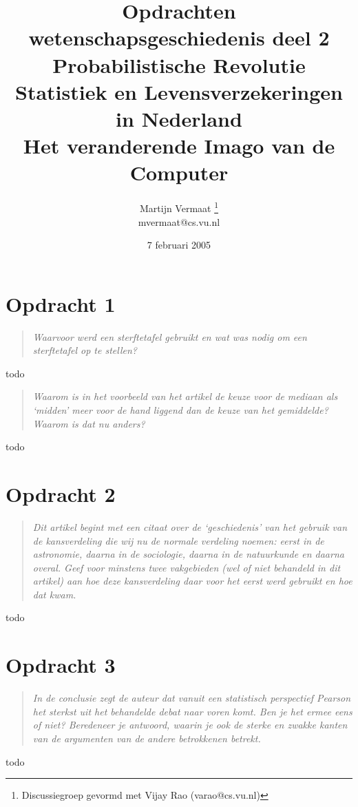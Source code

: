 \documentclass[a4paper,11pt]{article}
\title{Opdrachten wetenschapsgeschiedenis deel 2\\[0.6em]
\normalsize{Probabilistische Revolutie\\
Statistiek en Levensverzekeringen in Nederland\\
Het veranderende Imago van de Computer}}
\author{
    Martijn Vermaat
    \footnote{Discussiegroep gevormd met Vijay Rao (varao@cs.vu.nl)}\\
    mvermaat@cs.vu.nl
}
\date{7 februari 2005}
\begin{document}
\maketitle


\section*{Opdracht 1}


\begin{quote}
\emph{Waarvoor werd een sterftetafel gebruikt en wat was nodig om een
  sterftetafel op te stellen?}
\end{quote}


todo


\begin{quote}
\emph{Waarom is in het voorbeeld van het artikel de keuze voor de mediaan als
  `midden' meer voor de hand liggend dan de keuze van het gemiddelde? Waarom
  is dat nu anders?}
\end{quote}


todo


\section*{Opdracht 2}


\begin{quote}
\emph{Dit artikel begint met een citaat over de `geschiedenis' van het gebruik
van de kansverdeling die wij nu de normale verdeling noemen: eerst in de
astronomie, daarna in de sociologie, daarna in de natuurkunde en daarna
overal. Geef voor minstens twee vakgebieden (wel of niet behandeld in dit
artikel) aan hoe deze kansverdeling daar voor het eerst werd gebruikt en hoe
dat kwam.}
\end{quote}


todo


\section*{Opdracht 3}


\begin{quote}
\emph{In de conclusie zegt de auteur dat vanuit een statistisch perspectief
  Pearson het sterkst uit het behandelde debat naar voren komt. Ben je het
  ermee eens of niet? Beredeneer je antwoord, waarin je ook de sterke en
  zwakke kanten van de argumenten van de andere betrokkenen betrekt.}
\end{quote}


todo
\end{document}
